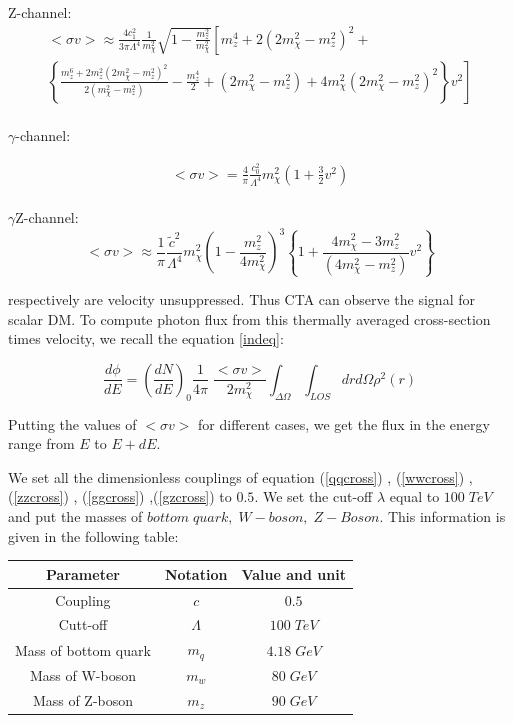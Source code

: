 \documentclass[12pt]{report}
\begin{document}
Z-channel:
\begin{multline}
<\sigma v> \approx \frac{4c^2_1}{3 \pi \Lambda^4}  \frac{1}{m^2_\chi}  \sqrt{1-\frac{m^2_z}{m^2_\chi}} \left[ m^4_z + 2(2 m^2_\chi -m^2_z)^2 + \right.\\
\left. \left\{ \frac{ m^6_z+2 m^2_z (2 m^2_\chi - m^2_z)^2 }{2(m^2_\chi - m^2_z)} -\frac{m^4_z}{2} + (2 m^2_\chi - m^2_z) + 4 m^2_\chi (2 m^2_\chi - m^2_z)^2 \right\} v^2  \right]
\end{multline}\\



$\gamma$-channel:

\begin{align}
<\sigma v> = \frac{4}{\pi} \frac{c^2_0}{\Lambda^4} m^2_\chi \left(1+\frac{3}{2} v^2 \right)
\end{align}\\

$\gamma$Z-channel:
\begin{equation}
 <\sigma v> \approx \frac{1}{\pi} \frac{\tilde{c}^2}{\Lambda^4} m^2_\chi \left( 1- \frac{m^2_z}{4 m^2_\chi} \right)^3 \left\{1 + \frac{4m^2_\chi - 3m^2_z}{(4m^2_\chi - m^2_z)} v^2\right\} 
\end{equation}






 respectively are velocity unsuppressed. Thus CTA can observe the signal for scalar DM. To compute photon flux from this thermally averaged cross-section times velocity, we recall the equation \ref{indeq}:
 
 
\begin{equation}
\frac{d\phi}{dE} = \left(\frac{dN}{dE}\right)_0 \frac{1}{4 \pi}\; \frac{<\sigma v> }{2 m^2_\chi} \int_{\Delta\Omega} \int_{LOS} dr d\Omega \rho^2(r)
\end{equation} 
 
Putting the values of $<\sigma v>$ for different cases, we get the flux in the energy range from $E$ to $E+dE$.
 

We set all the dimensionless couplings of equation (\ref{qqcross}) , (\ref{wwcross}) , (\ref{zzcross}) , (\ref{ggcross}) ,(\ref{gzcross}) to $0.5$. We set the cut-off $\lambda$ equal to $100\; TeV$ and put the masses of $bottom\; quark,\; W-boson,\; Z-Boson$. This information is given in the following table:

\begin{center}
\begin{tabular}{|c|c|c|}
\hline
Parameter & Notation & Value and unit \\ \hline
Coupling &$c$ & $0.5$ \\ \hline
Cutt-off & $\Lambda$ & $100\; TeV$\\ \hline
Mass of bottom quark & $m_q$ & $4.18\; GeV$\\ \hline
Mass of W-boson & $m_w$ & $80\; GeV$\\ \hline
Mass of Z-boson & $m_z$ & $90\; GeV$\\ \hline
\end{tabular}
\end{center}
\end{document}
